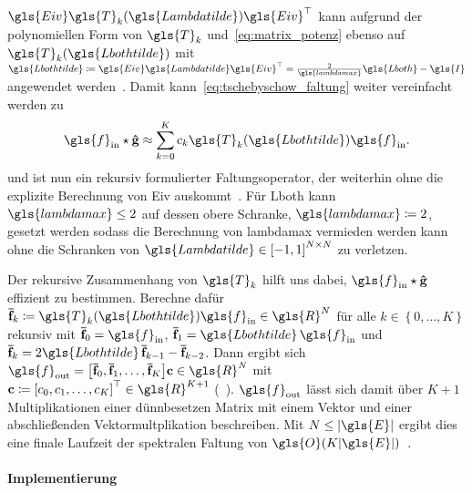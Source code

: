 $\gls{Eiv}\gls{T}_k\left(\gls{Lambdatilde}\right)\gls{Eiv}^{\top}$ kann aufgrund der polynomiellen Form von $\gls{T}_k$ und~\eqref{eq:matrix_potenz} ebenso auf $\gls{T}_k\left(\gls{Lbothtilde}\right)$ mit $\gls{Lbothtilde} \coloneqq \gls{Eiv}\gls{Lambdatilde}\gls{Eiv}^{\top} = \frac{2}{\gls{lambdamax}}\gls{Lboth} - \gls{I}$ angewendet werden~\cite{Defferrard}.
Damit kann~\eqref{eq:tschebyschow_faltung} weiter vereinfacht werden zu
\begin{equation}
  \gls{f}_{\mathrm{in}} \star \ve{\hat g} \approx \sum_{k=0}^K c_k\gls{T}_k\left(\gls{Lbothtilde}\right)\gls{f}_{\mathrm{in}}.
  \label{eq:tschebyschow_faltung_L}
\end{equation}
und ist nun ein rekursiv formulierter Faltungsoperator, der weiterhin ohne die explizite Berechnung von \gls{Eiv} auskommt~\cite{Defferrard}.
Für \gls{Lboth} kann $\gls{lambdamax} \leq 2$ auf dessen obere Schranke, \dhe{} $\gls{lambdamax} \coloneqq 2$, gesetzt werden sodass die Berechnung von \gls{lambdamax} vermieden werden kann ohne die Schranken von $\gls{Lambdatilde} \in {\left[-1, 1\right]}^{N \times N}$ zu verletzen.

Der rekursive Zusammenhang von $\gls{T}_k$ hilft uns dabei, $\gls{f}_{\mathrm{in}} \star \ve{\hat g}$ effizient zu bestimmen.
Berechne dafür $\ve{\bar f}_k \coloneqq \gls{T}_k\left(\gls{Lbothtilde}\right)\gls{f}_{\mathrm{in}} \in \gls{R}^N$ für alle $k \in \left\{0, \ldots, K\right\}$ rekursiv mit $\ve{\bar f}_0 = \gls{f}_{\mathrm{in}}$, $\ve{\bar f}_1 = \gls{Lbothtilde}\,\gls{f}_{\mathrm{in}}$ und $\ve{\bar f}_k = 2 \gls{Lbothtilde}\,\ve{\bar f}_{k-1} - \ve{\bar f}_{k - 2}$.
Dann ergibt sich $\gls{f}_{\mathrm{out}} = \left[\ve{\bar f}_0, \ve{\bar f}_1, \ldots, \ve{\bar f}_K\right]\ve{c} \in \gls{R}^N$ mit $\ve{c} \coloneqq {\left[c_0, c_1, \ldots, c_K\right]}^{\top} \in \gls{R}^{K+1}$ (\vgl{}~\cite{Hammond}).
$\gls{f}_{\mathrm{out}}$ lässt sich damit über $K + 1$ Multiplikationen einer dünnbesetzen Matrix mit einem Vektor und einer abschließenden Vektormultplikation beschreiben.
Mit $N \leq \left|\gls{E}\right|$ ergibt dies eine finale Laufzeit der spektralen Faltung von $\gls{O}\left(K\left|\gls{E}\right|\right)$~\cite{Defferrard}.

\paragraph{Implementierung}
\label{tschebyschow_tensor}

